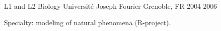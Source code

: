 \begin{cventries}
\cventry
  {L1 and L2 Biology} %
  {Université Joseph Fourier} %
  {Grenoble, FR} %
  {2004-2006} %
  {
    \begin{cvitems} %
      Specialty: modeling of natural phenomena (R-project).
    \end{cvitems}
  }

\end{cventries}
